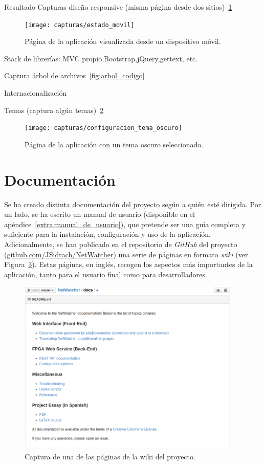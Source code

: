 Resultado Capturas diseño responsive (misma página desde dos sitios)~\ref{fig:captura:movil}
\begin{figure}[!htp]
  \centering
  \texttt{[image: capturas/estado\_movil]}
  \caption{Página de la aplicación visualizada desde un dispositivo móvil.}
  \label{fig:captura:movil}
\end{figure}

Stack de librerías: MVC propio,Bootstrap,jQuery,gettext, etc.

Captura árbol de archivos~\ref{fig:arbol_codigo}

Internacionalización

Temas (captura algún temas)~\ref{fig:captura:oscuro}
\begin{figure}[!htp]
  \centering
  \texttt{[image: capturas/configuracion\_tema\_oscuro]}
  \caption{Página de la aplicación con un tema oscuro seleccionado.}
  \label{fig:captura:oscuro}
\end{figure}


\section{Documentación \label{sec:imp:docs}}

Se ha creado distinta documentación del proyecto según a quién esté dirigida.
Por un lado, se ha escrito un manual de usuario (disponible en el apéndice~\ref{extra:manual_de_usuario}), que pretende ser una guía completa y suficiente para la instalación, configuración y uso de la aplicación.
Adicionalmente, se han publicado en el repositorio de \textit{GitHub} del proyecto (\url{github.com/JSidrach/NetWatcher}) una serie de páginas en formato \textit{wiki} (ver Figura~\ref{fig:captura:wiki}). Estas páginas, en inglés, recogen los aspectos más importantes de la aplicación, tanto para el usuario final como para desarrolladores.

\begin{figure}[!htp]
  \centering
  \includegraphics[width=0.95\textwidth,clip=true]{graphics/capturas/github_docs}
  \caption{Captura de una de las páginas de la wiki del proyecto.}
  \label{fig:captura:wiki}
\end{figure} 

